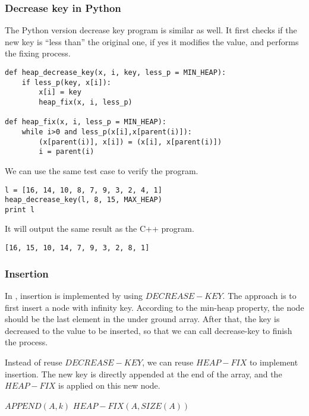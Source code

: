 \documentclass{article}
\begin{document}
\subsubsection*{Decrease key in Python}
The Python version decrease key program is similar as well. It first
checks if the new key is ``less than'' the original one, if yes it
modifies the value, and performs the fixing process.

\lstset{language=Python}
\begin{lstlisting}
def heap_decrease_key(x, i, key, less_p = MIN_HEAP):
    if less_p(key, x[i]):
        x[i] = key
        heap_fix(x, i, less_p)

def heap_fix(x, i, less_p = MIN_HEAP):
    while i>0 and less_p(x[i],x[parent(i)]):
        (x[parent(i)], x[i]) = (x[i], x[parent(i)])
        i = parent(i)
\end{lstlisting}

We can use the same test case to verify the program.

\begin{lstlisting}
l = [16, 14, 10, 8, 7, 9, 3, 2, 4, 1]
heap_decrease_key(l, 8, 15, MAX_HEAP)
print l
\end{lstlisting}

It will output the same result as the C++ program.

\begin{verbatim}
[16, 15, 10, 14, 7, 9, 3, 2, 8, 1]
\end{verbatim}

\subsubsection{Insertion}

In \cite{CLRS}, insertion is implemented by using $DECREASE-KEY$.
The approach is to first insert a node with infinity key. According
to the min-heap property, the node should be the last element
in the under ground array. After that, the key is decreased to
the value to be inserted, so that we can call decrease-key to
finish the process.

Instead of reuse $DECREASE-KEY$, we can reuse $HEAP-FIX$ to implement
insertion. The new key is directly appended at the end of the array,
and the $HEAP-FIX$ is applied on this new node.

\begin{algorithmic}[1]
  \State $APPEND(A, k)$
  \State $HEAP-FIX(A, SIZE(A))$
\EndFunction
\end{algorithmic}
\end{document}
